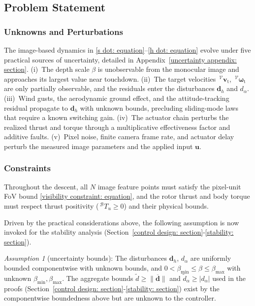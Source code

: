 \documentclass{IEEEtaes}
\begin{document}
\subsection{Problem Statement} \label{problem statement: section}
\subsubsection{Unknowns and Perturbations} \label{unknowns: section}
The image-based dynamics in \eqref{s dot: equation}--\eqref{h dot: equation} evolve under five practical sources of uncertainty, detailed in Appendix~\ref{uncertainty appendix: section}. (i)~The depth scale $\beta$ is unobservable from the monocular image and approaches its largest value near touchdown. (ii)~The target velocities $\,^\mathcal{V}\boldsymbol{v}_\text{t}$, $\,^\mathcal{V}\boldsymbol{\omega}_\text{t}$ are only partially observable, and the residuals enter the disturbances $\boldsymbol{d}_h$ and $d_\alpha$. (iii)~Wind gusts, the aerodynamic ground effect, and the attitude-tracking residual propagate to $\boldsymbol{d}_h$ with unknown bounds, precluding sliding-mode laws that require a known switching gain. (iv)~The actuator chain perturbs the realized thrust and torque through a multiplicative effectiveness factor and additive faults. (v)~Pixel noise, finite camera frame rate, and actuator delay perturb the measured image parameters and the applied input $\boldsymbol{u}$.

\subsubsection{Constraints} \label{constraints: section}
Throughout the descent, all $N$ image feature points must satisfy the pixel-unit FoV bound \eqref{visibility constraint: equation}, and the rotor thrust and body torque must respect thrust positivity ($\,^\mathcal{B}T_u\ge 0$) and their physical bounds.

Driven by the practical considerations above, the following assumption is now invoked for the stability analysis (Section~\ref{control design: section}-\ref{stability: section}).

\textit{Assumption 1} (uncertainty bounds): The disturbances $\boldsymbol{d}_h$, $d_{\alpha}$ are uniformly bounded componentwise with unknown bounds, and $0<\beta_{\min}\le\beta\le\beta_{\max}$ with unknown $\beta_{\min},\beta_{\max}$. The aggregate bounds $\tilde{d}\ge\|\boldsymbol{\overline{d}}\|$ and $\tilde{d}_\alpha\ge|d_\alpha|$ used in the proofs (Section~\ref{control design: section}-\ref{stability: section}) exist by the componentwise boundedness above but are unknown to the controller.
\end{document}
